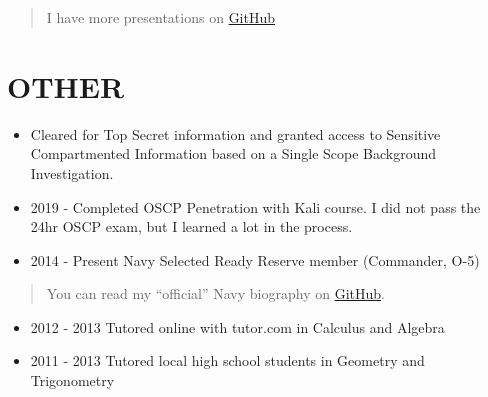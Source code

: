 \documentclass[10pt]{article}
\def\tightlist{}
\begin{document}
\begin{quote}
I have more presentations on \href{https://github.com/?q=slides}{GitHub}
\end{quote}

\hypertarget{other}{%
\section{OTHER}\label{other}}

\begin{itemize}
\tightlist
\item
  Cleared for Top Secret information and granted access to Sensitive
  Compartmented Information based on a Single Scope Background
  Investigation.
\item
  2019 - Completed OSCP Penetration with Kali course. I did not pass the
  24hr OSCP exam, but I learned a lot in the process.
\item
  2014 - Present Navy Selected Ready Reserve member (Commander, O-5)
\end{itemize}

\begin{quote}
You can read my ``official'' Navy biography on
\href{https://github.com/jhwohlgemuth/navy-biography}{GitHub}.
\end{quote}

\begin{itemize}
\tightlist
\item
  2012 - 2013 Tutored online with tutor.com in Calculus and Algebra
\item
  2011 - 2013 Tutored local high school students in Geometry and
  Trigonometry
\end{itemize}

\end{document}
